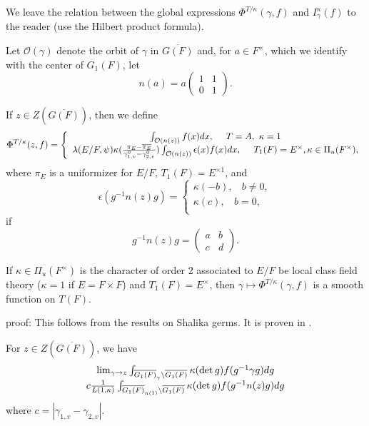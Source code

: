 We leave the relation between the global expressions
$\Phi^{T/\kappa}(\gamma,f)$ and $I^\kappa_\gamma(f)$ to
the reader (use the Hilbert product formula).

Let ${\mathcal{O}}(\gamma)$ denote the orbit of
$\gamma$ in $\overline{G(F)}$ and,
for $a\in F^\times$, which we identify with the center of $G_1(F)$, let
\[
n(a)=a
\left(
\begin{array}{cc}
1&1\\ 0&1
\end{array}
\right).
\]

\begin{definition}\label{defn:7.13} If $z\in Z(\overline{G(F)})$, then we define
\[
\Phi^{T/\kappa}(z,f)
=
\left\{
\begin{array}{c}
\int_{{\mathcal{O}}(n(z))}
f(x)dx,\ \ \ \ T=A,\ \kappa =1\\
\lambda(E/F,\psi)
\kappa({\pi_E-\overline{\pi_E}\over \gamma_{1,v}^0-\gamma_{2,v}^0})
\int_{{\mathcal{O}}(n(z))}\epsilon(x)f(x)dx,\ \ \ \ T_1(F)=E^\times,
\kappa\in \Pi_u(F^\times),
\end{array}
\right.
\]
where $\pi_E$ is a uniformizer for $E/F$, $T_1(F)=E^{\times 1}$,
and
\[
\epsilon(g^{-1}n(z)g)=
\left\{
\begin{array}{c}
\kappa(-b),\ \ \ \ b\not= 0,\\
\kappa(c),\ \ \ \ b= 0,\\
\end{array}
\right.
\]
if
\[
g^{-1}n(z)g=
\left(
\begin{array}{cc}
a&b\\c&d
\end{array}
\right).
\]
\end{definition}

\begin{lemma}\label{lem:7.14} If $\kappa\in \Pi_u(F^\times)$ is the character
of order 2
associated to $E/F$ be local class field theory ($\kappa =1$
if $E=F\times F$) and $T_1(F)=E^\times$, then
$\gamma\longmapsto \Phi^{T/\kappa}(\gamma,f)$ is a smooth function on
$T(F)$.
\end{lemma}

proof: This follows from the results on Shalika germs. It is proven
in \cite{J3}.

\begin{lemma}\label{lem:7.15} For $z\in Z(\overline{G(F)})$, we have
\[
\begin{array}{c}
\lim_{\gamma\rightarrow z}
\int_{\overline{G_1(F)}_\gamma\backslash \overline{G_1(F)}}
\kappa(\det{g})f(g^{-1}\gamma g)dg\\
c{1\over L(1,\kappa)}
\int_{\overline{G_1(F)}_{n(1)}\backslash \overline{G_1(F)}}
\kappa(\det{g})f(g^{-1}n(z) g)dg
\end{array}
\]
where $c=|\gamma_{1,v}-\gamma_{2,v}|$.
\end{lemma} 

